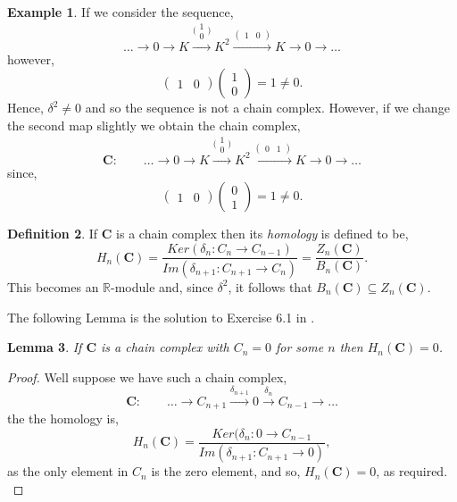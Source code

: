 \documentclass[11.5pt, twoside, a4paper, titlepage]{report}
\providecommand{\equ}[0]{\begin{equation*}}
\providecommand{\eequ}[0] {\end{equation*}}
\theoremstyle{definition}
\newtheorem{mydef}{Definition}[section]
\newtheorem{eg}[mydef]{Example}
\theoremstyle{plain}
\newtheorem{lem}[mydef]{Lemma}
\begin{document}
\begin{eg} \label{Kchaineg}
If we consider the sequence, 
\equ 
\dots \xrightarrow{} 0 \xrightarrow{} K \xrightarrow{\big(\begin{smallmatrix} 1\\ 0 \end{smallmatrix}\big)} K^2 \xrightarrow{(\begin{smallmatrix}1 & 0 \end{smallmatrix})} K \xrightarrow{} 0 \xrightarrow{} \dots
\eequ
however,
\equ
\begin{pmatrix}
1 & 0
\end{pmatrix}
\begin{pmatrix*}
1\\
0
\end{pmatrix*}
= 1 \neq 0.
\eequ
Hence, $\delta^2 \neq0$ and so the sequence is not a chain complex. However, if we change the second map slightly we obtain the chain complex,
\equ
\mathbf{C}: \qquad \dots \xrightarrow{} 0 \xrightarrow{} K \xrightarrow{\big(\begin{smallmatrix} 1\\ 0 \end{smallmatrix}\big)} K^2 \xrightarrow{(\begin{smallmatrix}0 & 1 \end{smallmatrix})} K \xrightarrow{} 0 \xrightarrow{} \dots
\eequ
since, 
\equ
\begin{pmatrix}
1 & 0
\end{pmatrix}
\begin{pmatrix*}
0\\
1
\end{pmatrix*}
= 1 \neq 0.
\eequ
\end{eg}

\begin{mydef}
If $\mathbf{C}$ is a chain complex then its \emph{homology} is defined to be,
\begin{equation*}
H_n(\mathbf{C})=\frac{Ker(\delta_n:C_n \rightarrow C_{n-1})}{Im(\delta_{n+1}:C_{n+1} \rightarrow C_n)} =\frac{Z_n(\mathbf{C})}{B_n(\mathbf{C})}.
\end{equation*}
This becomes an $\mathbb{R}$-module and, since $\delta^2$, it follows that $B_n(\mathbf{C})\subseteq Z_n(\mathbf{C})$.
\end{mydef}

The following Lemma is the solution to Exercise 6.1 in \cite{Rotman}.

\begin{lem}
If $\mathbf{C}$ is a chain complex with $C_n=0$ for some $n$ then $H_n(\mathbf{C})=0$.
\end{lem}
\begin{proof}
Well suppose we have such a chain complex, 
\equ
\mathbf{C}: \qquad \dots \xrightarrow{} C_{n+1} \xrightarrow{\delta_{n+1}} 0 \xrightarrow{\delta_n} C_{n-1} \xrightarrow{} \dots
\eequ
the the homology is,
\equ
H_n(\mathbf{C})=\frac{Ker(\delta_n: 0 \to C_{n-1}}{Im(\delta_{n+1}: C_{n+1}\to 0)},
\eequ
as the only element in $C_n$ is the zero element, and so, $H_n(\mathbf{C})=0$, as required.\\
\end{proof}
\end{document}
